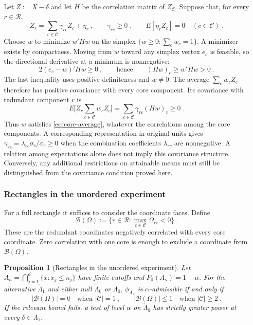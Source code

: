 \documentclass[11pt]{article}
\newcommand{\red}[1]{{\color{red}#1}} %
\numberwithin{equation}{section}
\newtheorem{proposition}{Proposition}
\theoremstyle{definition}
\begin{document}
{Let $Z:=X-\delta$ and let $H$ be the correlation matrix of $Z_{\mathcal C}$. Suppose that, for every $r\in\mathcal R$,
\[
Z_r=\sum_{c\in\mathcal C}\gamma_{rc}Z_c+\eta_r~,
\qquad \gamma_{rc}\ge0~,
\qquad E[\eta_rZ_c]=0\quad(c\in\mathcal C)~.
\]
Choose $w$ to minimize $w'Hw$ on the simplex $\{w\ge0:\sum_c w_c=1\}$. A minimizer exists by compactness. Moving from $w$ toward any simplex vertex $e_c$ is feasible, so the directional derivative at a minimum is nonnegative:
\[
2(e_c-w)'Hw\ge0~,
\qquad\text{hence}\qquad
(Hw)_c\ge w'Hw>0~.
\]
The last inequality uses positive definiteness and $w\ne0$. The average $\sum_c w_cZ_c$ therefore has positive covariance with every core component. Its covariance with redundant component $r$ is
\[
E\Big[Z_r\sum_{c\in\mathcal C}w_cZ_c\Big]
=\sum_{c\in\mathcal C}\gamma_{rc}(Hw)_c\ge0~.
\]
Thus $w$ satisfies \eqref{eq:core-average}, whatever the correlations among the core components. A corresponding representation in original units gives $\gamma_{rc}=\lambda_{rc}\sigma_c/\sigma_r\ge0$ when the combination coefficients $\lambda_{rc}$ are nonnegative. A relation among expectations alone does not imply this covariance structure. Conversely, any additional restrictions on attainable means must still be distinguished from the covariance condition proved here.

{\color{red}\subsubsection*{Rectangles in the unordered experiment}}

\red{For a full rectangle it suffices to consider the coordinate faces. Define}
\begin{equation}\label{eq:modified-bad-coordinates}
\mathcal B(\Omega):=\Big\{r\in\mathcal R:\max_{c\in\mathcal C}\Omega_{cr}<0\Big\}~.
\end{equation}
These are the redundant coordinates negatively correlated with every core coordinate. Zero correlation with one core is enough to exclude a coordinate from $\mathcal B(\Omega)$.

\red{%
\begin{proposition}[Rectangles in the unordered experiment]\label{prop:modified-rectangles}
Let $A_\kappa=\bigcap_{j=1}^d\{x:x_j\le\kappa_j\}$ have finite cutoffs and $P_0(A_\kappa)=1-\alpha$. For the alternative $\widetilde\Lambda_1$ and either null $\widetilde\Lambda_0$ or $\Lambda_0$, $\phi_{A_\kappa}$ is $\alpha$-admissible if and only if
\[
 |\mathcal B(\Omega)|=0 \quad\text{when }|\mathcal C|=1~,
 \qquad
 |\mathcal B(\Omega)|\le1 \quad\text{when }|\mathcal C|\ge2~.
\]
If the relevant bound fails, a test of level $\alpha$ on $\widetilde\Lambda_0$ has strictly greater power at every $\delta\in\widetilde\Lambda_1$.
\end{proposition}
}

}
\end{document}
